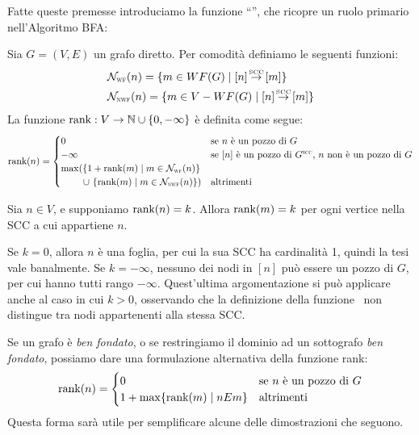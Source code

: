 Fatte queste premesse introduciamo la funzione ``\rankfunc'', che ricopre un ruolo primario nell'Algoritmo BFA:
\begin{definition}
    Sia $G = (V,E)$ un grafo diretto. Per comodità definiamo le seguenti funzioni:
    \begin{align*}
        &\mathcal{N}_{\scalebox{0.5}{WF}}(n) = \{m \in WF(G) \mid [n] \sccto [m]\}\\
        &\mathcal{N}_{\scalebox{0.5}{NWF}}(n) = \{m \in V - WF(G) \mid [n] \sccto [m]\}
    \end{align*}
    La funzione $\textup{rank}: V \to \mathbb{N} \cup \{0, -\infty\}$ è definita come segue:
    \begin{gather*}
        \rankfunc(n) = \begin{cases}
            0 &\text{se $n$ è un pozzo di $G$}\\
            -\infty &\text{se $[n]$ è un pozzo di $G^{\scalebox{.5}{SCC}}$, $n$ non è un pozzo di $G$}\\
            \max(\{1 + \rankfunc(m) \mid m \in \mathcal{N_{\scalebox{0.5}{WF}}}(n)\}\\
            \,\,\,\,\,\,\,\,\,\,\,\,\,\, \cup \,\, \{\rankfunc(m) \mid m \in \mathcal{N_{\scalebox{0.5}{NWF}}}(n)\}) &\text{altrimenti}
        \end{cases}
    \end{gather*}
\end{definition}
\begin{observation}
    Sia $n \in V$, e supponiamo $\textup{rank}(n) = k$. Allora $\textup{rank}(m) = k$ per ogni vertice nella SCC a cui appartiene $n$.
\end{observation}
\begin{proof2}
    Se $k = 0$, allora $n$ è una foglia, per cui la sua SCC ha cardinalità 1, quindi la tesi vale banalmente. Se $k = -\infty$, nessuno dei nodi in $[n]$ può essere un pozzo di $G$, per cui hanno tutti rango $-\infty$. Quest'ultima argomentazione si può applicare anche al caso in cui $k > 0$, osservando che la definizione della funzione \rankfunc \, non distingue tra nodi appartenenti alla stessa SCC.
\end{proof2}
Se un grafo è \emph{ben fondato}, o se restringiamo il dominio ad un sottografo \emph{ben fondato}, possiamo dare una formulazione alternativa della funzione rank:
\begin{gather*}
        \textup{rank}(n) = \begin{cases}
            0 &\text{se $n$ è un pozzo di $G$}\\
            1 + \max\{\textup{rank}(m) \mid n E m\} &\text{altrimenti}
        \end{cases}
\end{gather*}
Questa forma sarà utile per semplificare alcune delle dimostrazioni che seguono.

